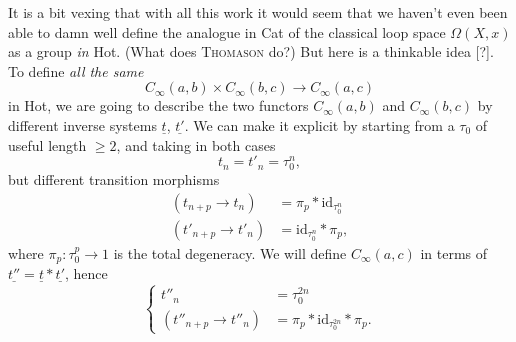 \documentclass[11pt]{article}
\begin{document}
It is a bit vexing that with all this work it would seem that we haven't even been able to damn well define the analogue in Cat of the classical loop space $\Omega(X, x)$ as a group \textit{in} Hot. (What does \textsc{Thomason} do?) But here is a thinkable idea [?]. To define \textit{all the same}
\[
C_\infty(a,b) \times C_\infty(b,c) \longrightarrow C_\infty(a,c)
\]
in Hot, we are going to describe the two functors $C_\infty(a,b)$ and $C_\infty(b,c)$ by different inverse systems $\underline{t}$, $\underline{t'}$. We can make it explicit by starting from a $\tau_0$ of useful length $\geq 2$, and taking in both cases
\[
t_n = t'_n = \tau_0^n,
\]
but different transition morphisms
\[
\begin{aligned}
(t_{n+p} \longrightarrow t_n) &= \pi_p * \mathrm{id}_{\tau_0^n} \\
(t'_{n+p} \longrightarrow t'_n) &= \mathrm{id}_{\tau_0^n} * \pi_p,
\end{aligned}
\]
where $\pi_p : \tau_0^p \longrightarrow 1$ is the total degeneracy. We will define $C_\infty(a,c)$ in terms of $\underline{t''} = \underline{t} * \underline{t'}$, hence
\[
\left\{
\begin{aligned}
t''_n &= \tau_0^{2n} \\
(t''_{n+p} \longrightarrow t''_n) &= \pi_p * \mathrm{id}_{\tau_0^{2n}} * \pi_p.
\end{aligned}
\right.
\]
\end{document}

